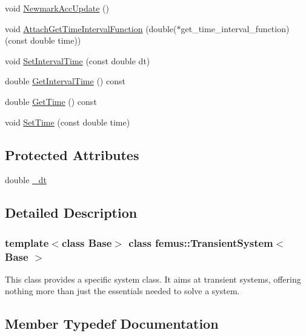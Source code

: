 \begin{DoxyCompactItemize}
\item 
void \mbox{\hyperlink{classfemus_1_1_transient_system_ae34a0bdb4bc4cadfb9f4c45124c2cbd9}{Newmark\+Acc\+Update}} ()
\item 
void \mbox{\hyperlink{classfemus_1_1_transient_system_a460cb5896e2ca0023ea98ac242cae61e}{Attach\+Get\+Time\+Interval\+Function}} (double($\ast$get\+\_\+time\+\_\+interval\+\_\+function)(const double time))
\item 
void \mbox{\hyperlink{classfemus_1_1_transient_system_ac4c3f2853cb04407fbe2975d18c9bf2a}{Set\+Interval\+Time}} (const double dt)
\item 
double \mbox{\hyperlink{classfemus_1_1_transient_system_ac993f126734ae1c669e8470479d5c959}{Get\+Interval\+Time}} () const
\item 
double \mbox{\hyperlink{classfemus_1_1_transient_system_abf4bd555684003afeaa899f68ea37bd7}{Get\+Time}} () const
\item 
void \mbox{\hyperlink{classfemus_1_1_transient_system_aebe52e42794030d47770098430d4533d}{Set\+Time}} (const double time)
\end{DoxyCompactItemize}
\subsection*{Protected Attributes}
\begin{DoxyCompactItemize}
\item 
double \mbox{\hyperlink{classfemus_1_1_transient_system_aefd0fbc7c28cbcf0a8cf72707841c661}{\+\_\+dt}}
\end{DoxyCompactItemize}


\subsection{Detailed Description}
\subsubsection*{template$<$class Base$>$\newline
class femus\+::\+Transient\+System$<$ Base $>$}

This class provides a specific system class. It aims at transient systems, offering nothing more than just the essentials needed to solve a system. 

\subsection{Member Typedef Documentation}
\mbox{\label{classfemus_1_1_transient_system_ab305e3c2b57ea9f93730f7fc712b6403}} 
